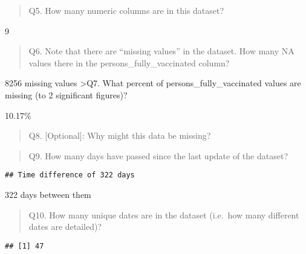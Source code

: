 \documentclass[
]{article}
\newenvironment{Shaded}{\begin{snugshade}}{\end{snugshade}}
\newcommand{\DecValTok}[1]{\textcolor[rgb]{0.00,0.00,0.81}{#1}}
\newcommand{\FunctionTok}[1]{\textcolor[rgb]{0.00,0.00,0.00}{#1}}
\newcommand{\NormalTok}[1]{#1}
\newcommand{\SpecialCharTok}[1]{\textcolor[rgb]{0.00,0.00,0.00}{#1}}
\begin{document}
\begin{quote}
Q5. How many numeric columns are in this dataset?
\end{quote}

9

\begin{quote}
Q6. Note that there are ``missing values'' in the dataset. How many NA
values there in the persons\_fully\_vaccinated column?
\end{quote}

8256 missing values \textgreater Q7. What percent of
persons\_fully\_vaccinated values are missing (to 2 significant
figures)?

10.17\%

\begin{quote}
Q8. {[}Optional{]}: Why might this data be missing?
\end{quote}

\begin{quote}
Q9. How many days have passed since the last update of the dataset?
\end{quote}

\begin{Shaded}
\end{Shaded}

\begin{verbatim}
## Time difference of 322 days
\end{verbatim}

322 days between them

\begin{quote}
Q10. How many unique dates are in the dataset (i.e.~how many different
dates are detailed)?
\end{quote}

\begin{Shaded}
\end{Shaded}

\begin{verbatim}
## [1] 47
\end{verbatim}
\end{document}
